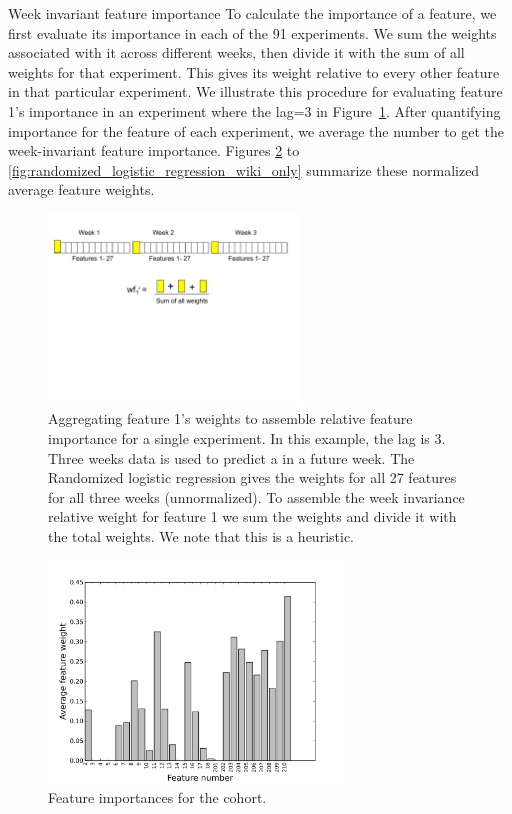 \begin{paragraph}
{Week invariant feature importance} To calculate the importance of a feature, we first evaluate its importance in each of the 91 experiments. We sum the weights associated with it across different weeks, then divide it with the sum of all weights for that experiment. This gives its weight relative to every other feature in that particular experiment. We illustrate this procedure for evaluating feature 1's importance in an experiment where the lag=3 in Figure~\ref{fig:wif}. After quantifying importance for the feature of each experiment, we average the number to get the week-invariant feature importance.  Figures \ref{fig:randomized_logistic_regression_no_collab} to \ref{fig:randomized_logistic_regression_wiki_only} summarize these normalized average feature weights. 

\begin{figure}[ht!]
  \caption{Aggregating feature 1's weights to assemble relative feature importance for a single experiment. In this example, the lag is 3. Three weeks data is used to predict a \sti in a future week. The Randomized logistic regression gives the weights for all 27 features for all three weeks (unnormalized). To assemble the week invariance relative weight for feature 1 we sum the weights and divide it with the total weights. We note that this is a heuristic. }\label{fig:wif}
  \centering
    \includegraphics[width=0.6\textwidth]{figures/wif}
\end{figure}

\begin{figure}[ht!]
  \caption{Feature importances for the \neither cohort.}\label{fig:randomized_logistic_regression_no_collab}
  \centering
    \includegraphics[width=0.7\textwidth]{figures/logreg/randomized_no_collab.png}
\end{figure}


\end{paragraph}
